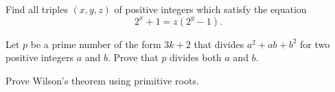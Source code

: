 \documentclass{subfile}
\begin{document}
	\begin{problem}
		Find all triples $(x,y,z)$ of positive integers which satisfy the equation $$2^x+1=z(2^y-1).$$ %
	\end{problem}



	\begin{problem}
		Let $p$ be a prime number of the form $3k+2$ that divides $a^2+ab+b^2$ for two positive integers $a$ and $b$. Prove that $p$ divides both $a$ and $b$. %
	\end{problem}



	\begin{problem}
		Prove Wilson's theorem using primitive roots.
	\end{problem}

\end{document}
